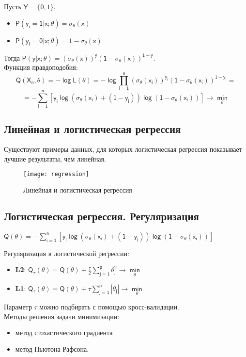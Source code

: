 \documentclass{article}
\begin{document}
Пусть $\mathsf{Y}=\{0,1\}$.
\begin{itemize}
	\item $\mathsf{P(y_i=1|x;\theta)=\sigma_\theta(x)}$
	\item $\mathsf{P(y_i=0|x;\theta)=1-\sigma_\theta(x)}$
\end{itemize}
Тогда $\mathsf{P(y|x;\theta)=(\sigma_\theta(x))^y(1-\sigma_\theta(x))^{1-y}}.$ \\
Функция правдоподобия:
\begin{equation*}
	\mathsf{Q(X_n, \theta)=-\log L(\theta)=-\log \prod\limits_{i=1}^n(\sigma_\theta(x_i))^{y_i}(1-\sigma_\theta(x_i))^{1-y_i}}= 
\end{equation*}
\begin{equation*}
	=\mathsf{-\sum\limits_{i=1}^n [y_i\log (\sigma_\theta(x_i)+(1-y_i))\log (1-\sigma_\theta(x_i))]\to \min\limits_{\theta}}
\end{equation*}

\subsection{Линейная и логистическая регрессия}

Существуют примеры данных, для которых логистическая регрессия показывает лучшие результаты, чем линейная.

\begin{figure}[h!]
	\begin{center}
		\texttt{[image: regression]}
	\end{center}
	\caption{Линейная и логистическая регрессия}
	\vspace{-5mm}
\end{figure}

\subsection{Логистическая регрессия. Регуляризация}
$\mathsf{Q(\theta)=-\sum\limits_{i=1}^n [y_i\log (\sigma_\theta(x_i)+(1-y_i))\log (1-\sigma_\theta(x_i))]}$

Регуляризация в логистической регрессии:
\begin{itemize}
	\item {{\bf L2}: 
		$\mathsf{Q_\tau(\theta)=Q(\theta)+\frac{\tau}{2}\sum\limits_{j=1}^p \theta_j^2 \to \min\limits_\theta}$
	}
	\item {{\bf L1}: 
		$\mathsf{Q_\tau(\theta)=Q(\theta)+\tau\sum\limits_{j=1}^p |\theta_j| \to \min\limits_\theta}$
	}
\end{itemize}
Параметр $\mathsf{\tau}$ можно подбирать с помощью кросс-валидации. \\
Методы решения задачи минимизации: 
\begin{itemize}
	\item метод стохастического градиента
	\item метод Ньютона-Рафсона.
\end{itemize}
\end{document}
